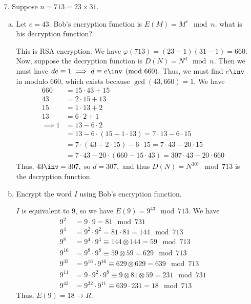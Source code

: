 \documentclass{article}
\begin{document}
\begin{itemize}
	\item[7.] Suppose $n=713=23\times 31.$
		\begin{enumerate}[(a)]
			\item Let $e=43.$ Bob's encryption function is $E(M)=M^e\mod n.$ what is his decryption function?
				\begin{soln}
					This is RSA encryption. We have $\varphi(713) = (23-1)(31-1) = 660.$ Now, suppose the decryption function is $D(N)=N^d\mod n.$ Then we must have $de\equiv 1\implies d\equiv e\inv\pmod {660}.$ Thus, we must find $e\inv$ in modulo 660, which exists because $\gcd(43, 660) = 1.$ We have
					\begin{align*}
						660 &= 15\cdot 43 + 15 \\
						43 &= 2\cdot 15 + 13 \\
						15 &= 1\cdot 13 + 2 \\
						13 &= 6\cdot 2 + 1 \\
						\implies 1 &= 13 - 6\cdot 2 \\
						&= 13 - 6\cdot(15-1\cdot 13) = 7\cdot 13 - 6\cdot 15 \\
						&= 7\cdot(43 - 2\cdot 15) - 6\cdot15 = 7\cdot 43 - 20\cdot 15 \\
						&= 7\cdot 43 - 20\cdot(660-15\cdot 43) = 307\cdot 43 - 20\cdot 660
					\end{align*}
					Thus, $43\inv = 307,$ so $d= 307,$ and thus $D(N)=N^{307}\mod{713}$ is the decryption function.
				\end{soln}

			\item Encrypt the word $I$ using Bob's encryption function.
				\begin{soln}
					$I$ is equivalent to 9, so we have $E(9) = 9^{43}\mod 713.$ We have
					\begin{align*}
						9^2 &= 9\cdot 9 = 81 \mod 731 \\
						9^4 &= 9^2\cdot 9^2 = 81\cdot 81 = 144\mod 713 \\
						9^8 &= 9^4\cdot 9^4 \equiv 144\otimes 144 = 59\mod 713 \\
						9^{16} &= 9^8\cdot 9^8 \equiv 59\otimes 59 = 629\mod 713 \\
						9^{32} &= 9^{16}\cdot 9^{16}\equiv 629\otimes 629 = 639 \mod 713 \\
						9^{11} &= 9\cdot 9^2\cdot 9^8 \equiv 9\otimes 81\otimes 59 = 231\mod 731 \\
						9^{43} &= 9^{32}\cdot 9^{11} \equiv 639\cdot 231=18\mod 713
					\end{align*}
					Thus, $E(9) = 18\to R.$
				\end{soln}


\end{enumerate}
\end{itemize}
\end{document}
